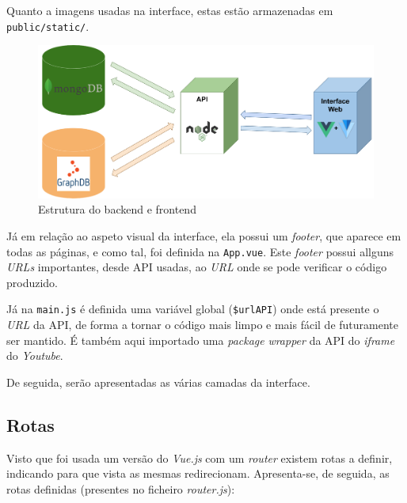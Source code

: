 \documentclass{article}
\begin{document}
Quanto a imagens usadas na interface, estas estão armazenadas em \texttt{public/static/}.

\begin{figure}[H]
    \centering
    \includegraphics[width=12cm]{Pictures/backend_frontend.png}
    \caption{Estrutura do backend e frontend}
    \label{backend_frontend}
\end{figure}

Já em relação ao aspeto visual da interface, ela possui um \textit{footer}, que aparece em todas as páginas, e como tal, foi definida na \texttt{App.vue}. Este \textit{footer} possui allguns \textit{URLs} importantes, desde API usadas, ao \textit{URL} onde se pode verificar o código produzido.

Já na \texttt{main.js} é definida uma variável global (\texttt{\$urlAPI}) onde está presente o \textit{URL} da API, de forma a tornar o código mais limpo e mais fácil de futuramente ser mantido. É também aqui importado uma \textit{package} \textit{wrapper} da API do \textit{iframe} do \textit{Youtube}.

De seguida, serão apresentadas as várias camadas da interface.

\subsection{Rotas}

Visto que foi usada um versão do \textit{Vue.js} com um \textit{router} existem rotas a definir, indicando para que vista as mesmas redirecionam. Apresenta-se, de seguida, as rotas definidas (presentes no ficheiro \textit{router.js}):
\end{document}
